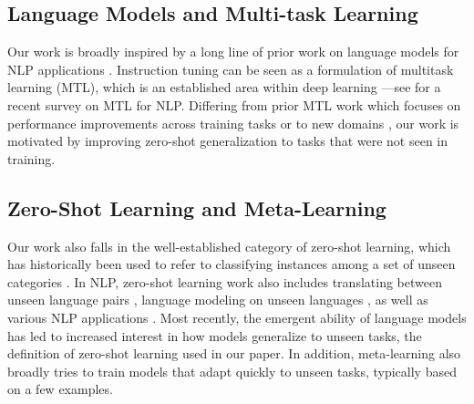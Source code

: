 \subsection{Language Models and Multi-task Learning}
Our work is broadly inspired by a long line of prior work on language models for NLP applications \citep[][\textit{inter alia}]{dai2015semi,peters-etal-2018-deep,howard-ruder-2018-universal,radford2018improving,radford2019language}. 
Instruction tuning can be seen as a formulation of multitask learning (MTL), which is an established area within deep learning \citep[][\textit{inter alia}]{collobert2011natural,luong2015multi,ruder2017overview,velay2018seq2seq,clark2019bam,liu2019multi}---see \citet{Worsham2020MultitaskLF} for a recent survey on MTL for NLP. 
Differing from prior MTL work which focuses on performance improvements across training tasks \citep{raffel2019exploring,aghajanyan2021muppet} or to new domains \citep{axelrod-etal-2011-domain}, our work is motivated by improving zero-shot generalization to tasks that were not seen in training.

\subsection{Zero-Shot Learning and Meta-Learning}
Our work also falls in the well-established category of zero-shot learning, which has historically been used to refer to classifying instances among a set of unseen categories \citep[][\textit{inter alia}]{lampert2009learning,romera2015embarrassingly,srivastava-etal-2018-zero,yin-etal-2019-benchmarking}.
In NLP, zero-shot learning work also includes translating between unseen language pairs \citep{johnson-etal-2017-googles,pham-etal-2019-improving}, language modeling on unseen languages \citep{lauscher-etal-2020-zero}, as well as various NLP applications \citep{liu-etal-2019-reconstructing,corazza-etal-2020-hybrid,wang2021zl3}.
Most recently, the emergent ability of language models \citep{brown2020language} has led to increased interest in how models generalize to unseen tasks, the definition of zero-shot learning used in our paper.
In addition, meta-learning \citep[][\textit{inter alia}]{finn2017model,vanschoren2018meta} also broadly tries to train models that adapt quickly to unseen tasks, typically based on a few examples.

